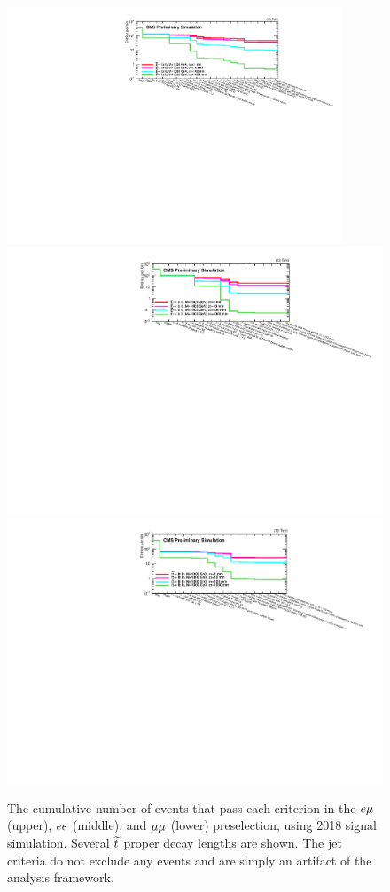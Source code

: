 \begin{figure}
\includegraphics[width=0.89\textwidth]{figures/selection/preselection/signal/cutFlow_2018EMuPreselection_1000GeV.pdf}
\includegraphics[width=\textwidth]{figures/selection/preselection/signal/cutFlow_2018EEPreselection_1000GeV.pdf}
\includegraphics[width=\textwidth]{figures/selection/preselection/signal/cutFlow_2018MuMuPreselection_1000GeV.pdf}
\caption{The cumulative number of events that pass each criterion in the $e{\mu}$ (upper), $ee$ (middle), and ${\mu}{\mu}$ (lower) preselection, using 2018 signal simulation. Several $\widetilde{t}$ proper decay lengths are shown. The jet criteria do not exclude any events and are simply an artifact of the analysis framework.}
\label{signal_cutflow}
\end{figure}